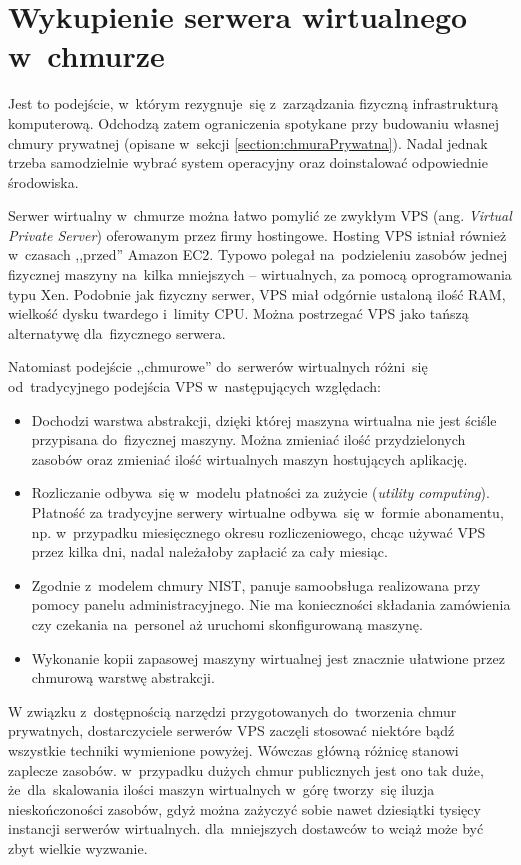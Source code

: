 \documentclass[12pt,a4paper,twoside,titlepage,openright]{book}
\begin{document}
\section{Wykupienie serwera wirtualnego w~chmurze}\label{section:podejscieVm}

Jest to podejście, w~którym rezygnuje~się z~zarządzania fizyczną infrastrukturą komputerową. Odchodzą zatem ograniczenia spotykane przy budowaniu własnej chmury prywatnej (opisane w~sekcji  \ref{section:chmuraPrywatna}). Nadal jednak trzeba samodzielnie wybrać system operacyjny oraz doinstalować odpowiednie środowiska.

Serwer wirtualny w~chmurze można łatwo pomylić ze zwykłym VPS (ang. \textit{Virtual Private Server}) oferowanym przez firmy hostingowe. Hosting VPS istniał również w~czasach ,,przed'' Amazon EC2. Typowo polegał na~podzieleniu zasobów jednej fizycznej maszyny na~kilka mniejszych -- wirtualnych, za pomocą oprogramowania typu Xen. Podobnie jak fizyczny serwer, VPS miał odgórnie ustaloną ilość RAM, wielkość dysku twardego i~limity CPU. Można postrzegać VPS jako tańszą alternatywę dla~fizycznego serwera. 

Natomiast podejście ,,chmurowe'' do~serwerów wirtualnych różni~się od~tradycyjnego podejścia VPS w~następujących względach:
\begin{itemize}
\item Dochodzi warstwa abstrakcji, dzięki której maszyna wirtualna nie jest ściśle przypisana do~fizycznej maszyny. Można zmieniać ilość przydzielonych zasobów oraz zmieniać ilość wirtualnych maszyn hostujących aplikację.
\item Rozliczanie odbywa~się w~modelu płatności za zużycie (\textit{utility computing}). Płatność za tradycyjne serwery wirtualne odbywa~się w~formie abonamentu, np. w~przypadku miesięcznego okresu rozliczeniowego, chcąc używać VPS przez kilka dni, nadal należałoby zapłacić za cały miesiąc.
\item Zgodnie z~modelem chmury NIST, panuje samoobsługa realizowana przy pomocy panelu administracyjnego. Nie ma konieczności składania zamówienia czy czekania na~personel aż uruchomi skonfigurowaną maszynę.
\item Wykonanie kopii zapasowej maszyny wirtualnej jest znacznie ułatwione przez chmurową warstwę abstrakcji. 
\end{itemize}

W związku z~dostępnością narzędzi przygotowanych do~tworzenia chmur prywatnych, dostarczyciele serwerów VPS zaczęli stosować niektóre bądź wszystkie techniki wymienione powyżej. Wówczas główną różnicę stanowi zaplecze zasobów. w~przypadku dużych chmur publicznych jest ono tak duże, że~dla~skalowania ilości maszyn wirtualnych w~górę tworzy~się iluzja nieskończoności zasobów, gdyż można zażyczyć sobie nawet dziesiątki tysięcy instancji serwerów wirtualnych. dla~mniejszych dostawców to wciąż może być zbyt wielkie wyzwanie.
\end{document}
